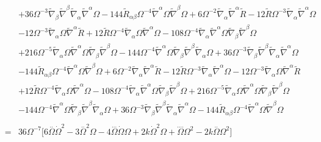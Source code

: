 \documentclass[10pt,letterpaper]{article}
\numberwithin{equation}{section}
\begin{document}
\begin{eqnarray}
&& + 36 \Omega^{-3} \tilde\nabla_{\beta }\tilde \nabla^{\beta }\tilde\nabla_{\alpha }\tilde \nabla^{\alpha }\Omega - 144 \tilde R_{\alpha \beta } \Omega^{-4} \tilde \nabla^{\alpha }\Omega \tilde \nabla^{\beta }\Omega +6 \Omega^{-2} \tilde\nabla_{\alpha }\tilde \nabla^{\alpha }\tilde R - 12 \tilde R \Omega^{-3} \tilde\nabla_{\alpha }\tilde \nabla^{\alpha }\Omega \nonumber \\ 
&& - 12 \Omega^{-3} \tilde\nabla_{\alpha }\Omega \tilde \nabla^{\alpha }\tilde R + 12 \tilde R \Omega^{-4} \tilde\nabla_{\alpha }\Omega \tilde \nabla^{\alpha }\Omega - 108 \Omega^{-4} \tilde\nabla_{\alpha }\tilde \nabla^{\alpha }\Omega \tilde\nabla_{\beta }\tilde \nabla^{\beta }\Omega \nonumber \\ 
&& + 216 \Omega^{-5} \tilde\nabla_{\alpha }\Omega \tilde \nabla^{\alpha }\Omega \tilde\nabla_{\beta }\tilde \nabla^{\beta }\Omega - 144 \Omega^{-4} \tilde \nabla^{\alpha }\Omega \tilde\nabla_{\beta }\tilde \nabla^{\beta }\tilde\nabla_{\alpha }\Omega + 36 \Omega^{-3} \tilde\nabla_{\beta }\tilde \nabla^{\beta }\tilde\nabla_{\alpha }\tilde \nabla^{\alpha }\Omega \nonumber \\ 
&& - 144 \tilde R_{\alpha \beta } \Omega^{-4} \tilde \nabla^{\alpha }\Omega \tilde \nabla^{\beta }\Omega +6 \Omega^{-2} \tilde\nabla_{\alpha }\tilde \nabla^{\alpha }\tilde R - 12 \tilde R \Omega^{-3} \tilde\nabla_{\alpha }\tilde \nabla^{\alpha }\Omega - 12 \Omega^{-3} \tilde\nabla_{\alpha }\Omega \tilde \nabla^{\alpha }\tilde R \nonumber \\ 
&& + 12 \tilde R \Omega^{-4} \tilde\nabla_{\alpha }\Omega \tilde \nabla^{\alpha }\Omega - 108 \Omega^{-4} \tilde\nabla_{\alpha }\tilde \nabla^{\alpha }\Omega \tilde\nabla_{\beta }\tilde \nabla^{\beta }\Omega + 216 \Omega^{-5} \tilde\nabla_{\alpha }\Omega \tilde \nabla^{\alpha }\Omega \tilde\nabla_{\beta }\tilde \nabla^{\beta }\Omega \nonumber \\ 
&& - 144 \Omega^{-4} \tilde \nabla^{\alpha }\Omega \tilde\nabla_{\beta }\tilde \nabla^{\beta }\tilde\nabla_{\alpha }\Omega + 36 \Omega^{-3} \tilde\nabla_{\beta }\tilde \nabla^{\beta }\tilde\nabla_{\alpha }\tilde \nabla^{\alpha }\Omega - 144 \tilde R_{\alpha \beta } \Omega^{-4} \tilde \nabla^{\alpha }\Omega \tilde \nabla^{\beta }\Omega 
\\ \nonumber\\
&=& 36\Omega^{-7}\bigg[ 
6 \overset{..}{\Omega} \dot{\Omega}^2 - 3 \overset{..}{\Omega}^2 \Omega - 4 \overset{...}{\Omega} \dot{\Omega} \Omega + 2 k \dot{\Omega}^2 \Omega + \overset{....}{\Omega} \Omega^2 - 2 k \overset{..}{\Omega} \Omega^2
\bigg]
\end{eqnarray}
%
\end{document}
